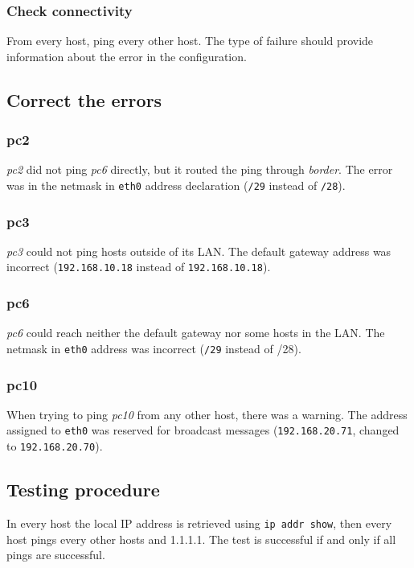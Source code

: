 \documentclass{homework}
\newcommand{\mt}{\texttt}
\begin{document}
    \subsubsection{Check connectivity}
    From every host, ping every other host. The type of failure should provide information about the error in the configuration.
    
    \subsection{Correct the errors}
    
    \subsubsection{pc2}
    \textit{pc2} did not ping \textit{pc6} directly, but it routed the ping through \textit{border}. The error was in the netmask in \mt{eth0} address declaration (\mt{/29} instead of \mt{/28}).
    
    \subsubsection{pc3}
    \textit{pc3} could not ping hosts outside of its LAN. The default gateway address was incorrect (\mt{192.168.10.18} instead of \mt{192.168.10.18}).
    
    \subsubsection{pc6}
    \textit{pc6} could reach neither the default gateway nor some hosts in the LAN. The netmask in \mt{eth0} address was incorrect (\mt{/29} instead of {/28}).
    
    \subsubsection{pc10}
    When trying to ping \textit{pc10} from any other host, there was a warning. The address assigned to \mt{eth0} was reserved for broadcast messages (\mt{192.168.20.71}, changed to \mt{192.168.20.70}).
    
    \subsection{Testing procedure}
    In every host the local IP address is retrieved using \mt{ip addr show}, then every host pings every other hosts and 1.1.1.1. The test is successful if and only if all pings are successful.
    
\end{document}
